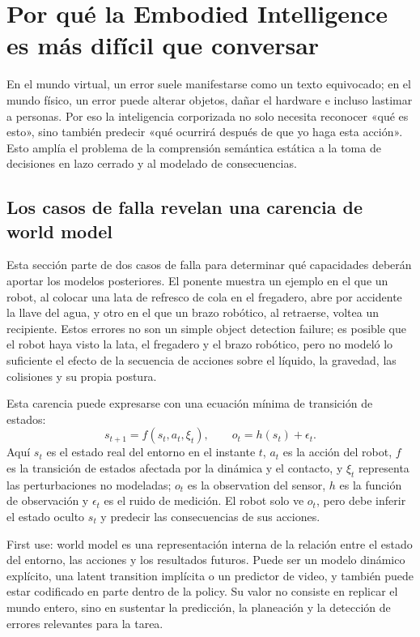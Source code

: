 \section{Por qué la Embodied Intelligence es más difícil que conversar}

En el mundo virtual, un error suele manifestarse como un texto equivocado; en el mundo físico, un error puede alterar objetos, dañar el hardware e incluso lastimar a personas. Por eso la inteligencia corporizada no solo necesita reconocer «qué es esto», sino también predecir «qué ocurrirá después de que yo haga esta acción». Esto amplía el problema de la comprensión semántica estática a la toma de decisiones en lazo cerrado y al modelado de consecuencias.

\subsection{Los casos de falla revelan una carencia de world model}

Esta sección parte de dos casos de falla para determinar qué capacidades deberán aportar los modelos posteriores. El ponente muestra un ejemplo en el que un robot, al colocar una lata de refresco de cola en el fregadero, abre por accidente la llave del agua, y otro en el que un brazo robótico, al retraerse, voltea un recipiente. Estos errores no son un simple object detection failure; es posible que el robot haya visto la lata, el fregadero y el brazo robótico, pero no modeló lo suficiente el efecto de la secuencia de acciones sobre el líquido, la gravedad, las colisiones y su propia postura.


Esta carencia puede expresarse con una ecuación mínima de transición de estados:
$$
s_{t+1}=f(s_t,a_t,\xi_t),\qquad o_t=h(s_t)+\epsilon_t.
$$
Aquí $s_t$ es el estado real del entorno en el instante $t$, $a_t$ es la acción del robot, $f$ es la transición de estados afectada por la dinámica y el contacto, y $\xi_t$ representa las perturbaciones no modeladas; $o_t$ es la observation del sensor, $h$ es la función de observación y $\epsilon_t$ es el ruido de medición. El robot solo ve $o_t$, pero debe inferir el estado oculto $s_t$ y predecir las consecuencias de sus acciones.

\begin{knowledgebox}{First use: world model}
 es una representación interna de la relación entre el estado del entorno, las acciones y los resultados futuros. Puede ser un modelo dinámico explícito, una latent transition implícita o un predictor de video, y también puede estar codificado en parte dentro de la policy. Su valor no consiste en replicar el mundo entero, sino en sustentar la predicción, la planeación y la detección de errores relevantes para la tarea.
\end{knowledgebox}

